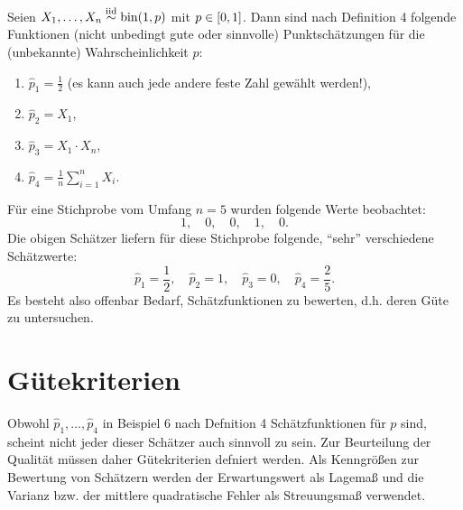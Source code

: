 \documentclass{lecture}
\begin{document}
    \begin{example}
        Seien \(X_1, \ldots, X_n \stackrel{\text{iid}}{\sim} \bin\parentheses*{1, p}\) mit \(p \in \brackets*{0, 1}\).
        Dann sind nach Definition 4 folgende Funktionen (nicht unbedingt gute oder sinnvolle) Punktschätzungen für die (unbekannte) Wahrscheinlichkeit \(p\):
        \begin{enumerate}
            \item \(\hat{p}_1 = \frac{1}{2}\) (es kann auch jede andere feste Zahl gewählt werden!),
            \item \(\hat{p}_2 = X_1\),
            \item \(\hat{p}_3 = X_1 \cdot X_n\),
            \item \(\hat{p}_4 = \frac{1}{n}\sum_{i = 1}^n X_i\).
        \end{enumerate}
        Für eine Stichprobe vom Umfang \(n = 5\) wurden folgende Werte beobachtet:
        \[
            1, \quad 0, \quad 0, \quad 1, \quad 0.
        \]
        Die obigen Schätzer liefern für diese Stichprobe folgende, ``sehr'' verschiedene Schätzwerte:
        \[
            \hat{p}_1 = \frac{1}{2}, \quad \hat{p}_2 = 1, \quad \hat{p}_3 = 0, \quad \hat{p}_4 = \frac{2}{5}.
        \]
        Es besteht also offenbar Bedarf, Schätzfunktionen zu bewerten, d.h. deren Güte zu untersuchen.
    \end{example}


    \section*{Gütekriterien}

    Obwohl \(\hat{p}_1, \ldots, \hat{p}_4\) in Beispiel 6 nach Defnition 4 Schätzfunktionen für \(p\) sind, scheint nicht jeder dieser Schätzer auch sinnvoll zu sein.
    Zur Beurteilung der Qualität müssen daher Gütekriterien defniert werden.
    Als Kenngrößen zur Bewertung von Schätzern werden der Erwartungswert als Lagemaß und die Varianz bzw. der mittlere quadratische Fehler als Streuungsmaß verwendet.
\end{document}
